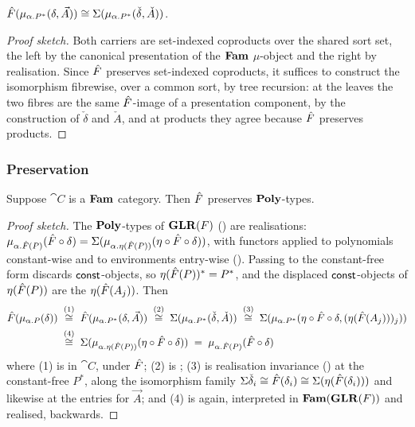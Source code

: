 \begin{lemma}
\label{lem:conservativity:carrier-isomorphism}
$\hat{F}(\mu_{\alpha.P^{*}}(\delta, \vec{A})) \cong \Sigma(\mu_{\alpha.P^{*}}(\check{\delta},
\check{A}))$.
\end{lemma}

\begin{proof}[Proof sketch]
Both carriers are set-indexed coproducts over the shared sort set, the left by the canonical
presentation of the $\mathbf{Fam}$ $\mu$-object and the right by realisation. Since $\hat{F}$ preserves
set-indexed coproducts, it suffices to construct the isomorphism fibrewise, over a common sort, by
tree recursion: at the leaves the two fibres are the same $\hat{F}$-image of a presentation component, by
the construction of $\check{\delta}$ and $\check{A}$, and at products they agree because $\hat{F}$
preserves products.
\end{proof}

\subsubsection{Preservation}

\begin{proposition}[Preservation]
\label{prop:conservativity:gf-preserves-poly}
Suppose $\cat{C}$ is a $\mathbf{Fam}$ category. Then $\hat{F}$ preserves $\mathbf{Poly}$-types.
\end{proposition}

\begin{proof}[Proof sketch]
The $\mathbf{Poly}$-types of $\mathbf{GLR}(F)$ () are realisations:
$\mu_{\alpha.\hat{F}(P)}(\hat{F} \circ \delta) = \Sigma(\mu_{\alpha.\eta(\hat{F}(P))}(\eta \circ \hat{F}
\circ \delta))$, with functors applied to polynomials constant-wise and to environments
entry-wise (). Passing to the constant-free form discards
$\mathsf{const}$-objects, so $\eta(\hat{F}(P))^{*} = P^{*}$, and the displaced $\mathsf{const}$-objects of
$\eta(\hat{F}(P))$ are the $\eta(\hat{F}(A_j))$. Then
\[
\begin{aligned}
  \hat{F}(\mu_{\alpha.P}(\delta))
  &\;\overset{(1)}{\cong}\; \hat{F}(\mu_{\alpha.P^{*}}(\delta, \vec{A}))
  \;\overset{(2)}{\cong}\; \Sigma(\mu_{\alpha.P^{*}}(\check{\delta}, \check{A}))
  \;\overset{(3)}{\cong}\; \Sigma(\mu_{\alpha.P^{*}}(\eta \circ \hat{F} \circ \delta,
    (\eta(\hat{F}(A_j)))_j)) \\
  &\;\overset{(4)}{\cong}\; \Sigma(\mu_{\alpha.\eta(\hat{F}(P))}(\eta \circ \hat{F} \circ \delta))
  \;=\; \mu_{\alpha.\hat{F}(P)}(\hat{F} \circ \delta)
\end{aligned}
\]
where (1) is  in $\cat{C}$, under $\hat{F}$; (2) is
; (3) is realisation invariance
() at the constant-free $P^{*}$, along the
isomorphism family $\Sigma\check{\delta}_i \cong \hat{F}(\delta_i) \cong
\Sigma(\eta(\hat{F}(\delta_i)))$ and likewise at the entries for $\vec{A}$; and (4) is
 again, interpreted in $\mathbf{Fam}(\mathbf{GLR}(F))$ and realised, backwards.
\end{proof}
